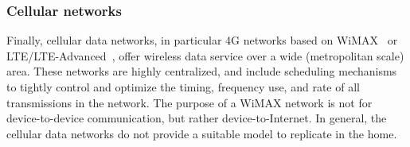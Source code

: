 \subsubsection{Cellular networks}
Finally, cellular data networks, in particular 4G networks based on WiMAX~\cite{wimax} or LTE/LTE-Advanced~\cite{lte}, offer wireless data service over a wide (metropolitan scale) area. These networks are highly centralized, and include scheduling mechanisms to tightly control and optimize the timing, frequency use, and rate of all transmissions in the network. The purpose of a WiMAX network is not for device-to-device communication, but rather device-to-Internet. In general, the cellular data networks do not provide a suitable model to replicate in the home.